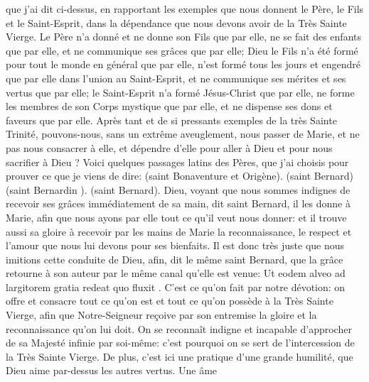 que j'ai dit ci-dessus, en rapportant les exemples que nous donnent le Père, le Fils et le Saint-Esprit, dans la
dépendance que nous devons avoir de la Très Sainte Vierge. Le Père n'a donné et ne donne son Fils que par elle,
ne se fait des enfants que par elle, et ne communique ses grâces que par elle; Dieu le Fils n'a été formé pour tout
le monde en général que par elle, n'est formé tous les jours et engendré que par elle dans l'union au Saint-Esprit,
et ne communique ses mérites et ses vertus que par elle; le Saint-Esprit n'a formé Jésus-Christ que par elle, ne
forme les membres de son Corps mystique que par elle, et ne dispense ses dons et faveurs que par elle. Après
tant et de si pressants exemples de la très Sainte Trinité, pouvons-nous, sans un extrême aveuglement, nous
passer de Marie, et ne pas nous consacrer à elle, et dépendre d'elle pour aller à Dieu et pour nous sacrifier à
Dieu ?
 Voici quelques passages latins des Pères, que j'ai choisis pour prouver ce que je viens de dire:  (saint
Bonaventure et Origène).
 (saint Bernard)
 (saint Bernardin ).
 (saint Bernard).
 Dieu, voyant que nous sommes indignes de recevoir ses grâces immédiatement de sa main, dit saint
Bernard, il les donne à Marie, afin que nous ayons par elle tout ce qu'il veut nous donner: et il trouve aussi sa
gloire à recevoir par les mains de Marie la reconnaissance, le respect et l'amour que nous lui devons pour ses
bienfaits. Il est donc très juste que nous imitions cette conduite de Dieu, afin, dit le même saint Bernard, que la
grâce retourne à son auteur par le même canal qu'elle est venue: Ut eodem alveo ad largitorem gratia redeat quo
fluxit .
C'est ce qu'on fait par notre dévotion: on offre et consacre tout ce qu'on est et tout ce qu'on possède à la Très
Sainte Vierge, afin que Notre-Seigneur reçoive par son entremise la gloire et la reconnaissance qu'on lui doit. On
se reconnaît indigne et incapable d'approcher de sa Majesté infinie par soi-même: c'est pourquoi on se sert de
l'intercession de la Très Sainte Vierge.
 De plus, c'est ici une pratique d'une grande humilité, que Dieu aime par-dessus les autres vertus. Une âme
